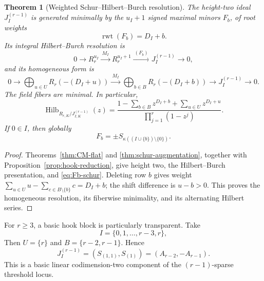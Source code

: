 \documentclass[10pt,fleqn]{article}
\numberwithin{equation}{section}
\newtheorem{theorem}{Theorem}[section]
\newcommand{\Hilb}{\operatorname{Hilb}}
\newcommand{\rwt}{\operatorname{rwt}}
\begin{document}
\begin{theorem}[Weighted Schur--Hilbert--Burch resolution]
\label{thm:HB}\label{cor:weighted-HB}
The height-two ideal $J_I^{(r-1)}$ is generated minimally by the $u_I+1$
signed maximal minors $F_b$, of root weights
\begin{equation}\label{eq:F-weight}
 \rwt(F_b)=D_I+b.
\end{equation}
Its integral Hilbert--Burch resolution is
\begin{equation}\label{eq:HB-ungraded}
 0\longrightarrow R_r^{u_I}\xrightarrow{\ M_I\ }R_r^{u_I+1}
 \xrightarrow{\ (F_b)\ }J_I^{(r-1)}\longrightarrow0,
\end{equation}
and its homogeneous form is
\begin{equation}\label{eq:weighted-HB}
 0\longrightarrow\bigoplus_{u\in U}R_r(-(D_I+u))
 \xrightarrow{\ M_I\ }
 \bigoplus_{b\in B}R_r(-(D_I+b))
 \longrightarrow J_I^{(r-1)}\longrightarrow0.
\end{equation}
The field fibers are minimal.  In particular,
\begin{equation}\label{eq:HB-Hilbert-series}
 \Hilb_{R_{r,K}/J_{I,K}^{(r-1)}}(z)=
 \frac{1-\displaystyle\sum_{b\in B}z^{D_I+b}
 +\displaystyle\sum_{u\in U}z^{D_I+u}}
 {\displaystyle\prod_{j=1}^r(1-z^j)}.
\end{equation}
If $0\in I$, then globally
\begin{equation}\label{eq:Fb-schur}
 F_b=\pm S_{\kappa((I\cup\{b\})\setminus\{0\})}.
\end{equation}
\end{theorem}

\begin{proof}
Theorems~\ref{thm:CM-flat} and \ref{thm:schur-augmentation}, together
with Proposition~\ref{prop:hook-reduction}, give height two, the
Hilbert--Burch presentation, and \eqref{eq:Fb-schur}.
Deleting row $b$ gives weight
$\sum_{u\in U}u-\sum_{c\in B\setminus\{b\}}c=D_I+b$;
the shift difference is $u-b>0$.  This proves the homogeneous resolution,
its fiberwise minimality, and its alternating Hilbert series.
\end{proof}

For $r\ge3$, a basic hook block is particularly transparent.  Take
\begin{equation}\label{eq:simple-hook-support}
 I=\{0,1,\ldots,r-3,r\},
\end{equation}
Then $U=\{r\}$ and $B=\{r-2,r-1\}$.  Hence
\begin{equation}\label{eq:simple-hook-ideal}
 J_I^{(r-1)}=(S_{(1,1)},S_{(1)})=(A_{r-2},-A_{r-1}).
\end{equation}
This is a basic linear codimension-two component of the $(r-1)$-sparse threshold locus.
\end{document}

